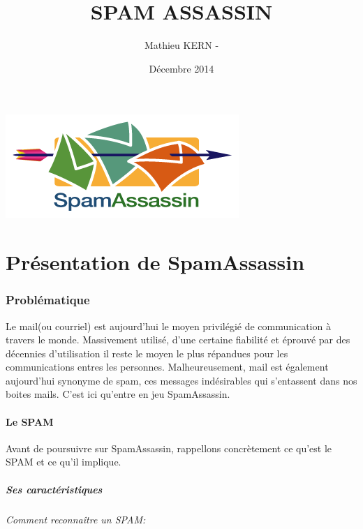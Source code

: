 \documentclass[a4paper,11pt]{report}
\title{SPAM ASSASSIN}
\date{Décembre 2014}
\author{Mathieu KERN -}
\begin{document}
\maketitle
\includegraphics{spamassassinintro.png}
\tableofcontents

\pagebreak

\part{Présentation de SpamAssassin}

\section{Problématique }

  Le mail(ou courriel) est aujourd'hui le moyen privilégié de communication à travers le monde. Massivement utilisé, 
d'une certaine fiabilité et éprouvé par des décennies d'utilisation il reste le moyen le plus répandues pour 
les communications entres les personnes. Malheureusement, mail est également aujourd'hui synonyme de spam, ces messages
indésirables qui s'entassent dans nos boites mails. C'est ici qu'entre en jeu SpamAssassin.

\subsection{Le SPAM}
Avant de poursuivre sur SpamAssassin, rappellons concrètement ce qu'est le SPAM et ce qu'il implique. 

\subsubsection{Ses caractéristiques}

\paragraph{Comment reconnaître un SPAM:}
\end{document}
